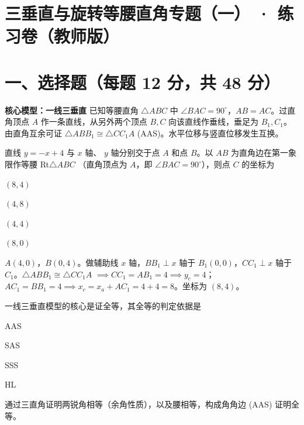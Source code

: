 \documentclass{exam-zh}
\begin{document}
\section*{三垂直与旋转等腰直角专题（一） · 练习卷（教师版）}

\section*{一、选择题（每题 12 分，共 48 分）}


\begin{keyideabox}
  \textbf{核心模型：一线三垂直}
  已知等腰直角 $\triangle ABC$ 中 $\angle BAC = 90^\circ$，$AB = AC$。过直角顶点 $A$ 作一条直线，从另外两个顶点 $B, C$ 向该直线作垂线，垂足为 $B_1, C_1$。由直角互余可证 $\triangle ABB_1 \cong \triangle CC_1A$ (AAS)。水平位移与竖直位移发生互换。
\end{keyideabox}



\begin{question}[points=12]
  直线 $y = -x + 4$ 与 $x$ 轴、 $y$ 轴分别交于点 $A$ 和点 $B$。以 $AB$ 为直角边在第一象限作等腰 Rt$\triangle ABC$ （直角顶点为 $A$，即 $\angle BAC = 90^\circ$），则点 $C$ 的坐标为
  \begin{choices}
    \item $(8, 4)$
    \item $(4, 8)$
    \item $(4, 4)$
    \item $(8, 0)$
  \end{choices}
  \paren[A]
  \begin{solutionblock}
    $A(4,0)$，$B(0,4)$。做辅助线 $x$ 轴，$BB_1 \perp x$ 轴于 $B_1(0,0)$，$CC_1 \perp x$ 轴于 $C_1$。$\triangle ABB_1 \cong \triangle CC_1A$ $\implies CC_1 = AB_1 = 4 \implies y_c = 4$；$AC_1 = BB_1 = 4 \implies x_c = x_a + AC_1 = 4+4=8$。坐标为 $(8, 4)$。
  \end{solutionblock}
\end{question}



\begin{question}[points=12]
  一线三垂直模型的核心是证全等，其全等的判定依据是
  \begin{choices}
    \item AAS
    \item SAS
    \item SSS
    \item HL
  \end{choices}
  \paren[A]
  \begin{solutionblock}
    通过三直角证明两锐角相等（余角性质），以及腰相等，构成角角边 (AAS) 证明全等。
  \end{solutionblock}
\end{question}
\end{document}
